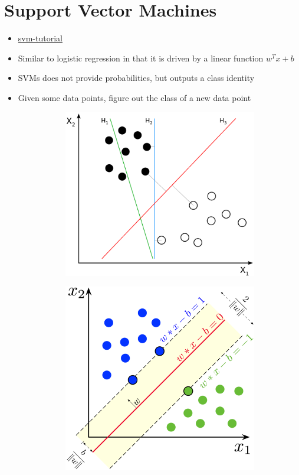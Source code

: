 \documentclass[../main.tex]{subfiles}
\begin{document}
\section{Support Vector Machines}
  \begin{itemize}
    \item \href{https://www.svm-tutorial.com/2014/11/svm-understanding-math-part-2/#hyperplane-equation}{svm-tutorial}
    \item Similar to logistic regression in that it is driven by a linear function $w^{T}x + b$
    \item SVMs does not provide probabilities, but outputs a class identity
    \item Given some data points, figure out the class of a new data point
    \begin{figure}[h]
        \caption{SVM}
        \centering
        \begin{subfigure}{.5\textwidth}
          \centering
          \includegraphics[width=.8\linewidth]{../imgs/svm.png}
          \label{fig:svm}
        \end{subfigure}%
        \begin{subfigure}{.5\textwidth}
          \centering
          \includegraphics[width=.8\linewidth]{../imgs/svm_hyperplane.png}

\end{subfigure}
\end{figure}
\end{itemize}
\end{document}

